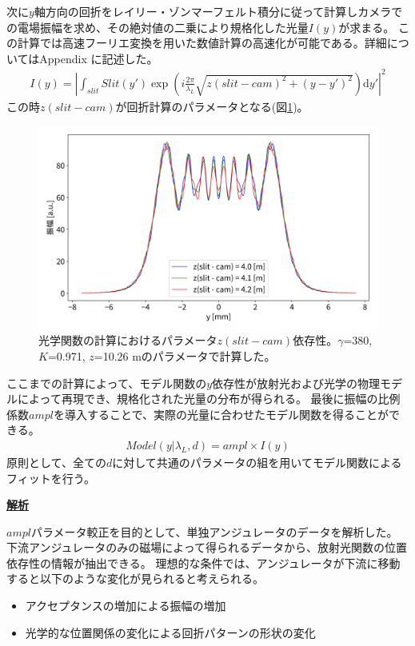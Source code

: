 \documentclass[a4paper,11pt,uplatex]{jsbook}
\begin{document}
次に$y$軸方向の回折をレイリー・ゾンマーフェルト積分に従って計算しカメラでの電場振幅を求め、その絶対値の二乗により規格化した光量$I(y)$が求まる。
この計算では高速フーリエ変換を用いた数値計算の高速化が可能である。詳細についてはAppendix に記述した。
\begin{align}
  I(y) = \left| \int_{slit} Slit(y')\exp(i\frac{2\pi}{\lambda_L} \sqrt{z(slit-cam)^2 + (y-y')^2})\text{d}y' \right|^2 
\end{align}
この時$z(slit-cam)$が回折計算のパラメータとなる(図\ref{zp})。
\begin{figure}[H]
  \centering
  \includegraphics[width = 0.8\linewidth]{image/2-zp.png}
  \caption[光学関数のスリット-カメラ間距離]{光学関数の計算におけるパラメータ$z(slit-cam)$依存性。$\gamma$=380, $K$=0.971, $z$=10.26 mのパラメータで計算した。}\label{zp}
\end{figure}

ここまでの計算によって、モデル関数の$y$依存性が放射光および光学の物理モデルによって再現でき、規格化された光量の分布が得られる。
最後に振幅の比例係数$ampl$を導入することで、実際の光量に合わせたモデル関数を得ることができる。
\begin{align}
  Model(y|\lambda_L,d) = ampl \times I(y) 
\end{align}
原則として、全ての$d$に対して共通のパラメータの組を用いてモデル関数によるフィットを行う。

\noindent \textbf{\underline{解析}}\par
$ampl$パラメータ較正を目的として、単独アンジュレータのデータを解析した。
下流アンジュレータのみの磁場によって得られるデータから、放射光関数の位置依存性の情報が抽出できる。
理想的な条件では、アンジュレータが下流に移動すると以下のような変化が見られると考えられる。
\begin{itemize}
  \item アクセプタンスの増加による振幅の増加
  \item 光学的な位置関係の変化による回折パターンの形状の変化
\end{itemize}
\end{document}
